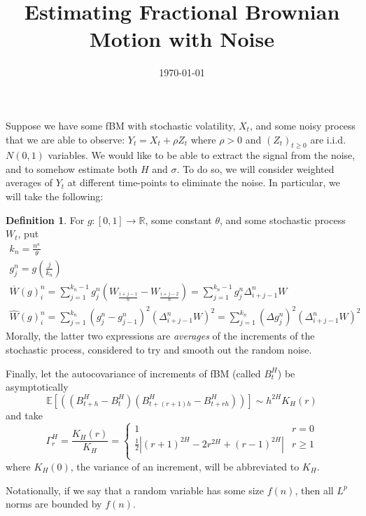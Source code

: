 \documentclass[12pt,letterpaper]{article}
\title{Estimating Fractional Brownian Motion with Noise}
\author{}
\date{\today}
\theoremstyle{definition}
\newtheorem*{definition}{Definition}
\newcommand{\R}{\mathbb{R}}
\newcommand{\E}{\mathbb{E}}
\begin{document}
\maketitle

Suppose we have some fBM with stochastic volatility, \(X_t\), and some noisy process that we are able to observe: \(Y_t = X_t + \rho Z_t\) where \(\rho > 0\) and \((Z_t)_{t \geq 0}\) are i.i.d.\ \(N(0,1)\) variables. We would like to be able to extract the signal from the noise, and to somehow estimate both \(H\) and \(\sigma\). To do so, we will consider weighted averages of \(Y_t\) at different time-points to eliminate the noise. In particular, we will take the following:

\begin{definition}
  For \(g: [0,1] \rightarrow \R\), some constant \(\theta\), and some stochastic process \(W_t\), put
  \begin{gather}
    k_n = \frac{n^\kappa}{\theta} \\
    g^n_j = g\left( \frac{j}{k_n} \right) \\
    \overline{W}(g)^n_i = \sum_{j=1}^{k_n-1}g^n_j\left( W_{\frac{i+j-1}{n}} - W_{\frac{i+j-2}{n}} \right) = \sum_{j=1}^{k_n-1}g^n_j\Delta_{i+j-1}^n W \\
    \widehat{W}(g)^n_i = \sum_{j=1}^{k_n}\left(g^n_j - g^n_{j-1}\right)^2\left(\Delta_{i+j-1}^n W\right)^2 = \sum_{j=1}^{k_n}\left(\Delta g^n_j\right)^2\left(\Delta_{i+j-1}^n W\right)^2
  \end{gather}
  Morally, the latter two expressions are \textit{averages} of the increments of the stochastic process, considered to try and smooth out the random noise.

  Finally, let the autocovariance of increments of fBM (called \(B_t^H\)) be asymptotically
  \begin{equation}
    \E\left[ \left( (B_{t+h}^H - B_t^H)(B_{t+(r+1)h}^H - B_{t+rh}^H) \right) \right] \sim h^{2H}K_H(r)
  \end{equation}
  and take
  \begin{equation}
    \Gamma_r^H = \frac{K_H(r)}{K_H} =
    \begin{cases}
      1 & r = 0 \\
      \frac{1}{2}\left| (r+1)^{2H} - 2r^{2H} + (r-1)^{2H}\right| & r \geq 1 \\
    \end{cases}
  \end{equation}
  where \(K_H(0)\), the variance of an increment, will be abbreviated to \(K_H\).

  Notationally, if we say that a random variable has some size \(f(n)\), then all \(L^p\) norms are bounded by \(f(n)\).
\end{definition}
\end{document}
